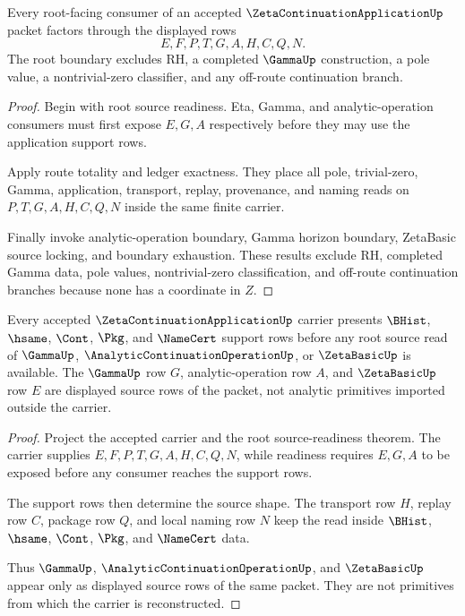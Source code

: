 \begin{theorem}
\label{thm:zeta-continuation-application-root-nonescape}
Every root-facing consumer of an accepted $\ZetaContinuationApplicationUp$ packet factors through the displayed rows
$$
E,F,P,T,G,A,H,C,Q,N.
$$
The root boundary excludes RH, a completed $\GammaUp$ construction, a pole value, a nontrivial-zero classifier, and any off-route continuation branch.
\end{theorem}
\begin{proof}
Begin with root source readiness. Eta, Gamma, and analytic-operation consumers must first expose $E,G,A$ respectively before they may use the application support rows.

Apply route totality and ledger exactness. They place all pole, trivial-zero, Gamma, application, transport, replay, provenance, and naming reads on $P,T,G,A,H,C,Q,N$ inside the same finite carrier.

Finally invoke analytic-operation boundary, Gamma horizon boundary, ZetaBasic source locking, and boundary exhaustion. These results exclude RH, completed Gamma data, pole values, nontrivial-zero classification, and off-route continuation branches because none has a coordinate in $Z$.
\end{proof}

\begin{theorem}
\label{thm:zeta-continuation-application-carrier-source-obligation}
Every accepted $\ZetaContinuationApplicationUp$ carrier presents $\BHist$, $\hsame$, $\Cont$, $\Pkg$, and $\NameCert$ support rows before any root source read of $\GammaUp$, $\AnalyticContinuationOperationUp$, or $\ZetaBasicUp$ is available. The $\GammaUp$ row $G$, analytic-operation row $A$, and $\ZetaBasicUp$ row $E$ are displayed source rows of the packet, not analytic primitives imported outside the carrier.
\end{theorem}
\begin{proof}
Project the accepted carrier and the root source-readiness theorem. The carrier supplies $E,F,P,T,G,A,H,C,Q,N$, while readiness requires $E,G,A$ to be exposed before any consumer reaches the support rows.

The support rows then determine the source shape. The transport row $H$, replay row $C$, package row $Q$, and local naming row $N$ keep the read inside $\BHist$, $\hsame$, $\Cont$, $\Pkg$, and $\NameCert$ data.

Thus $\GammaUp$, $\AnalyticContinuationOperationUp$, and $\ZetaBasicUp$ appear only as displayed source rows of the same packet. They are not primitives from which the carrier is reconstructed.
\end{proof}

